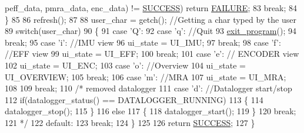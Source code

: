 \begin{DoxyCode}
      peff\_data, pmra\_data, enc\_data) != \hyperlink{calibration_2calibration_8h_aa90cac659d18e8ef6294c7ae337f6b58}{SUCCESS}) \textcolor{keywordflow}{return} \hyperlink{calibration_2calibration_8h_a6d58f9ac447476b4e084d7ca383f5183}{FAILURE};
83                         \textcolor{keywordflow}{break};
84         \}
85 
86         refresh();
87 
88         user\_char = getch(); \textcolor{comment}{//Getting a char typed by the user}
89         \textcolor{keywordflow}{switch}(user\_char)
90         \{
91                 \textcolor{keywordflow}{case} \textcolor{charliteral}{'Q'}:
92                 \textcolor{keywordflow}{case} \textcolor{charliteral}{'q'}: \textcolor{comment}{//Quit}
93                         \hyperlink{main_8c_a5f05ce725141ddfab683e059b1cd95ea}{exit\_program}();
94                         \textcolor{keywordflow}{break};
95                 \textcolor{keywordflow}{case} \textcolor{charliteral}{'i'}: \textcolor{comment}{//IMU view}
96                         ui\_state = UI\_IMU;
97                         \textcolor{keywordflow}{break};
98                 \textcolor{keywordflow}{case} \textcolor{charliteral}{'f'}: \textcolor{comment}{//EFF view}
99                         ui\_state = UI\_EFF;
100                         \textcolor{keywordflow}{break};
101                 \textcolor{keywordflow}{case} \textcolor{charliteral}{'e'}: \textcolor{comment}{// ENCODER view}
102                         ui\_state = UI\_ENC;
103                 \textcolor{keywordflow}{case} \textcolor{charliteral}{'o'}: \textcolor{comment}{//Overview}
104                         ui\_state = UI\_OVERVIEW;
105                         \textcolor{keywordflow}{break};
106                 \textcolor{keywordflow}{case} \textcolor{charliteral}{'m'}: \textcolor{comment}{//MRA}
107                         ui\_state = UI\_MRA;
108                 
109                         \textcolor{keywordflow}{break};
110                 \textcolor{comment}{/* removed datalogger}
111 \textcolor{comment}{                case 'd': //Datalogger start/stop}
112 \textcolor{comment}{                  if(datalogger\_status() == DATALOGGER\_RUNNING)}
113 \textcolor{comment}{                  \{}
114 \textcolor{comment}{                    datalogger\_stop();}
115 \textcolor{comment}{                  \}}
116 \textcolor{comment}{                  else}
117 \textcolor{comment}{                  \{}
118 \textcolor{comment}{                    datalogger\_start();}
119 \textcolor{comment}{                  \}}
120 \textcolor{comment}{                  break;}
121 \textcolor{comment}{                */}
122                \textcolor{keywordflow}{default}:
123                  \textcolor{keywordflow}{break};
124         \}
125 
126         \textcolor{keywordflow}{return} \hyperlink{calibration_2calibration_8h_aa90cac659d18e8ef6294c7ae337f6b58}{SUCCESS};
127 \}
\end{DoxyCode}


